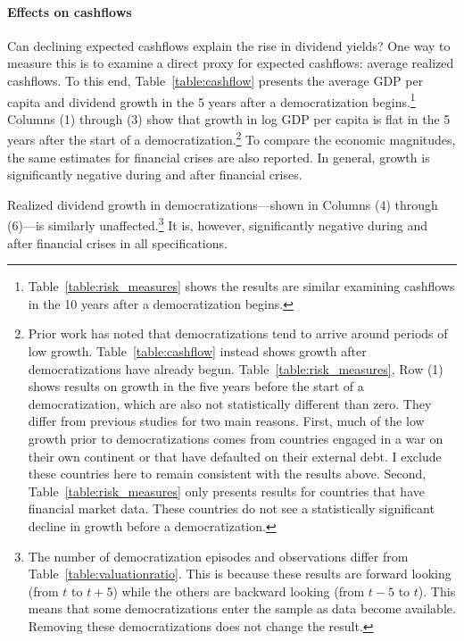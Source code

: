 \paragraph{Effects on cashflows}
Can declining expected cashflows explain the rise in dividend yields? One way to measure this is to examine a direct proxy for expected cashflows: average realized cashflows. To this end, Table~\ref{table:cashflow} presents the average GDP per capita and dividend growth in the 5 years after a democratization begins.\footnote{Table~\ref{table:risk_measures} shows the results are similar examining cashflows in the 10 years after a democratization begins. } Columns (1) through (3) show that growth in log GDP per capita is flat in the 5 years after the start of a democratization.\footnote{Prior work has noted that democratizations tend to arrive around periods of low growth.  Table~\ref{table:cashflow} instead shows growth after democratizations have already begun. Table~\ref{table:risk_measures}, Row (1) shows results on growth in the five years before the start of a democratization, which are also not statistically different than zero. They differ from previous studies for two main reasons. First, much of the low growth prior to democratizations comes from countries engaged in a war on their own continent or that have defaulted on their external debt. I exclude these countries here to remain consistent with the results above. Second, Table~\ref{table:risk_measures} only presents results for countries that have financial market data. These countries do not see a statistically significant decline in growth before a democratization.} To compare the economic magnitudes, the same estimates for financial crises are also reported. In general, growth is significantly negative during and after financial crises.

Realized dividend growth in democratizations---shown in Columns (4) through (6)---is similarly unaffected.\footnote{The number of democratization episodes and observations differ from Table~\ref{table:valuationratio}. This is because these results are forward looking (from  $t$ to $t+5$) while the others are backward looking (from  $t-5$ to $t$). This means that some democratizations enter the sample as data become available. Removing these democratizations does not change the result.} It is, however, significantly negative during and after financial crises in all specifications.



